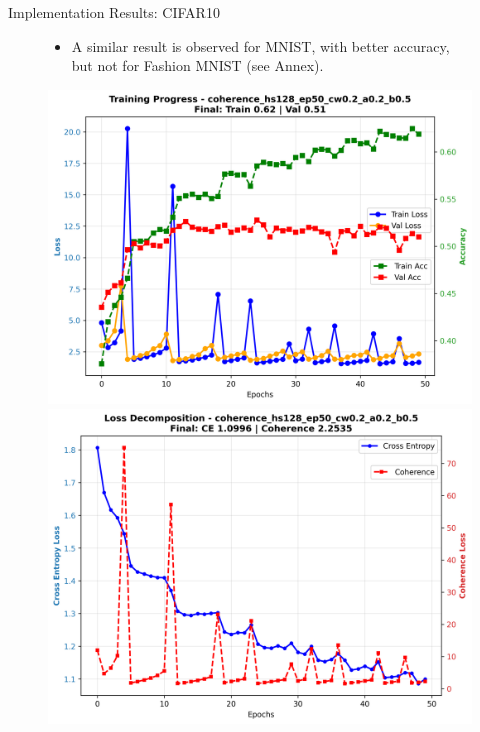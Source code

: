 \documentclass[9pt,dvipsnames]{beamer}
\begin{document}
\begin{frame}{Implementation Results: CIFAR10}
\begin{figure}[H]
\begin{minipage}[b]{0.48\textwidth}
			\begin{itemize}
				\item A similar result is observed for MNIST, with better accuracy, but not for Fashion MNIST (see Annex).
			\end{itemize}
			\vspace{0.05\textheight}
        \end{minipage}%
        \hfill
        \begin{minipage}[b]{0.48\textwidth}
            \centering
            \includegraphics[width=\textwidth,height=0.48\textheight,keepaspectratio]{../plots/mlp/cifar10/hs128_ep50/coherence_hs128_ep50_cw0.2_a0.2_b0.5_training_curves.png} \\
            \vspace{0.5em}
            \includegraphics[width=\textwidth,height=0.48\textheight,keepaspectratio]{../plots/mlp/cifar10/hs128_ep50/coherence_hs128_ep50_cw0.2_a0.2_b0.5_loss_decomposition.png}
        \end{minipage}
    \end{figure}

\end{frame}
\end{document}
